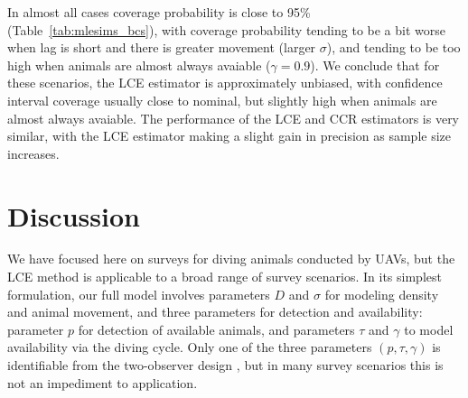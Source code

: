 \documentclass[useAMS, usenatbib, referee]{biom}\usepackage[]{graphicx}\usepackage[]{color}
\begin{document}
In almost all cases coverage probability is close to 95\% (Table~\ref{tab:mlesims_bcs}), with coverage probability tending to be a bit worse when lag is short and there is greater movement (larger $\sigma$), and tending to be too high when animals are almost always avaiable ($\gamma=0.9$). We conclude that for these scenarios, the LCE estimator is approximately unbiased, with confidence interval coverage usually close to nominal, but slightly high when animals are almost always avaiable. The performance of the LCE and CCR estimators is very similar, with the LCE estimator making a slight gain in precision as sample size increases.


\section{Discussion\label{sec:discussion}}


We have focused here on surveys for diving animals conducted by UAVs, but the LCE method is applicable to a broad range of survey scenarios. In its simplest formulation, our full model involves parameters $D$ and $\sigma$ for modeling density and animal movement, and three parameters for detection and availability: parameter $p$ for detection of available animals, and parameters $\tau$ and $\gamma$ to model availability via the diving cycle. Only one of the three parameters $(p, \tau, \gamma)$ is identifiable from the two-observer design \citep{Stevenson+al:19}, but in many survey scenarios this is not an impediment to application.
\end{document}

